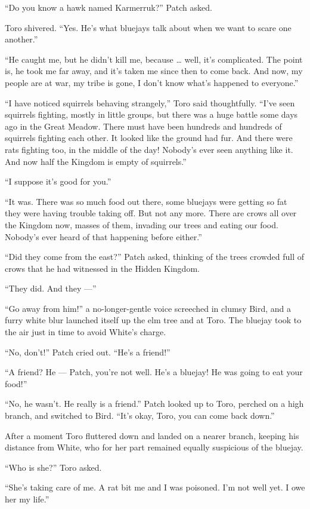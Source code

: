 \documentclass[ebook,oneside,openany,12pt]{memoir}
\begin{document}
“Do you know a hawk named Karmerruk?” Patch asked.

Toro shivered. “Yes. He’s what bluejays talk about when we want to
scare one another.”

“He caught me, but he didn’t kill me, because … well, it’s
complicated. The point is, he took me far away, and it’s taken me
since then to come back. And now, my people are at war, my tribe is
gone, I don’t know what’s happened to everyone.”

“I have noticed squirrels behaving strangely,” Toro said
thoughtfully. “I’ve seen squirrels fighting, mostly in little groups,
but there was a huge battle some days ago in the Great Meadow. There
must have been hundreds and hundreds of squirrels fighting each
other. It looked like the ground had fur. And there were rats fighting
too, in the middle of the day! Nobody’s ever seen anything like
it. And now half the Kingdom is empty of squirrels.”

“I suppose it’s good for you.”

“It was. There was so much food out there, some bluejays were getting
so fat they were having trouble taking off. But not any more. There
are crows all over the Kingdom now, masses of them, invading our trees
and eating our food. Nobody’s ever heard of that happening before
either.”

“Did they come from the east?” Patch asked, thinking of the trees
crowded full of crows that he had witnessed in the Hidden Kingdom.

“They did. And they —”

“Go away from him!” a no-longer-gentle voice screeched in clumsy Bird,
and a furry white blur launched itself up the elm tree and at
Toro. The bluejay took to the air just in time to avoid White’s
charge.

“No, don’t!” Patch cried out. “He’s a friend!”

“A friend? He — Patch, you’re not well. He’s a bluejay! He was going
to eat your food!”

“No, he wasn’t. He really is a friend.” Patch looked up to Toro,
perched on a high branch, and switched to Bird. “It’s okay, Toro, you
can come back down.”

After a moment Toro fluttered down and landed on a nearer branch,
keeping his distance from White, who for her part remained equally
suspicious of the bluejay.

“Who is she?” Toro asked.

“She’s taking care of me. A rat bit me and I was poisoned. I’m not
well yet. I owe her my life.”
\end{document}

